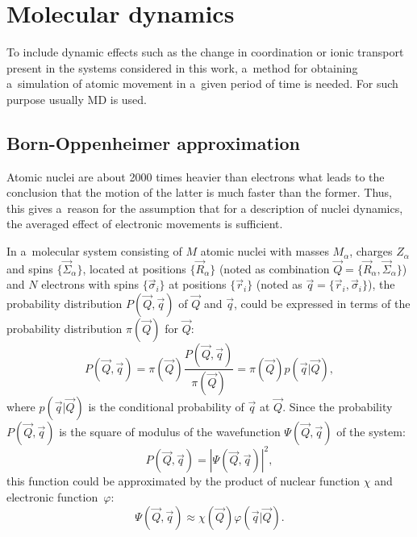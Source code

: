 \section{Molecular dynamics}

To include dynamic effects such as the change in coordination or ionic transport present in the systems considered in this work, a~method for obtaining a~simulation of atomic movement in a~given period of time is needed. For such purpose usually MD is used.

\subsection{Born-Oppenheimer approximation}

Atomic nuclei are about 2000 times heavier than electrons what leads to the conclusion that the motion of the latter is much faster than the former. Thus, this gives a~reason for the assumption that for a description of nuclei dynamics, the averaged effect of electronic movements is sufficient.

In a~molecular system consisting of $M$ atomic nuclei with masses $M_{\alpha}$, charges $Z_{\alpha}$ and spins $\{ \vec{\Sigma}_{\alpha} \}$, located at positions $\{ \vec{R}_{\alpha} \}$ (noted as combination $\vec{Q} = \{ \vec{R}_{\alpha}, \vec{\Sigma}_{\alpha} \}$) and $N$ electrons with spins $\{ \Vec{\sigma}_i \}$ at positions $\{ \vec{r}_i \}$ (noted as $\Vec{q} = \{ \Vec{r}_i, \Vec{\sigma}_i \}$), the probability distribution $P(\Vec{Q}, \Vec{q})$ of $\Vec{Q}$ and $\Vec{q}$, could be expressed in terms of the probability distribution $\pi(\Vec{Q})$ for $\Vec{Q}$:
\begin{equation}
    P(\vec{Q}, \vec{q}) = \pi(\vec{Q}) \frac{P(\vec{Q}, \vec{q})}{\pi(\vec{Q})} = \pi(\vec{Q}) p(\vec{q} | \vec{Q}),
\end{equation}
where $p(\vec{q} | \vec{Q})$ is the conditional probability of $\vec{q}$ at $\vec{Q}$. Since the probability $P(\vec{Q}, \vec{q})$ is the square of modulus of the wavefunction $\Psi(\vec{Q}, \vec{q})$ of the system:
\begin{equation}
    P(\vec{Q}, \vec{q}) = \left| \Psi(\vec{Q}, \vec{q}) \right|^2,
\end{equation}
this function could be approximated by the product of nuclear function $\chi$ and electronic function~$\varphi$:
\begin{equation}
    \Psi(\vec{Q}, \vec{q}) \approx \chi(\vec{Q}) \varphi(\vec{q}| \vec{Q}).
    \label{eq:bo-wavefunction}
\end{equation}


